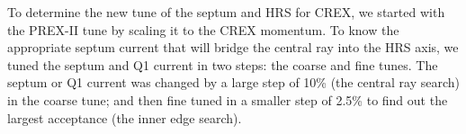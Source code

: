 \begin{comment}
    PREX tune B: p7 in https://prex.jlab.org/DocDB/0001/000112/001/OpticsCalc.pdf
    \begin{equation}
	\begin{pmatrix}
	    x_{fp}  \\
	    \theta_{fp}  \\
	    y_{fp}  \\
	    \phi_{fp}  \\
	    \delta_{fp}  \\
	\end{pmatrix}
	=
	\begin{pmatrix}
	    -3.09   & -0.02 & 0	& 0 & 16.73 \\
	    -0.31   & -0.32 & 0	& 0 & 2.5   \\
	    0	& 0 & 2.11  & 0.01  & -0.48 \\
	    0	& 0 & 1.1   & 0.48  & -0.19 \\
	    0	& 0 & 0	& 0 & 1	\\
	\end{pmatrix}
	\begin{pmatrix}
	    x_{tg}  \\
	    \theta_{tg}  \\
	    y_{tg}  \\
	    \phi_{tg}  \\
	    \delta_{tg}  \\
	\end{pmatrix}
    \end{equation}
\end{comment}

To determine the new tune of the septum and HRS for CREX, we started with the
PREX-II tune by scaling it to the CREX momentum. To know the appropriate septum 
current that will bridge the central ray into the HRS axis, we tuned the septum and 
Q1 current in two steps: the coarse and fine tunes. The septum or Q1 current 
was changed by a large step of 10\% (the central ray search) in the coarse tune;
and then fine tuned in a smaller step of 2.5\% to find out
the largest acceptance (the inner edge search).

